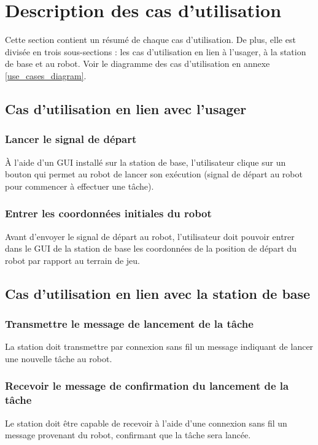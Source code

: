 


\chapter{Description des cas d'utilisation}
\label{s:utilisation}
Cette section contient un résumé de chaque cas d'utilisation. De plus, elle est divisée en trois sous-sections : les cas d'utilisation en lien à l'usager, à la station de base et au robot. 
Voir le diagramme des cas d'utilisation en annexe \ref{use_cases_diagram}.
\section{Cas d'utilisation en lien avec l'usager}
\subsection{Lancer le signal de départ}
À l'aide d'un GUI installé sur la station de base, l'utilisateur clique sur un bouton qui permet au robot de lancer son exécution (signal de départ au robot pour commencer à effectuer une tâche).
\subsection{Entrer les coordonnées initiales du robot}
Avant d'envoyer le signal de départ au robot, l'utilisateur doit pouvoir entrer dans le GUI de la station de base les coordonnées de la position de départ du robot par rapport au terrain de jeu.
\section{Cas d'utilisation en lien avec la station de base}
\subsection{Transmettre le message de lancement de la tâche}
La station doit transmettre par connexion sans fil un message indiquant de lancer une nouvelle tâche au robot.
\subsection{Recevoir  le message de confirmation du lancement de la tâche}
Le station doit être capable de recevoir à l'aide d'une connexion sans fil un message provenant du robot, confirmant que la tâche sera lancée.
